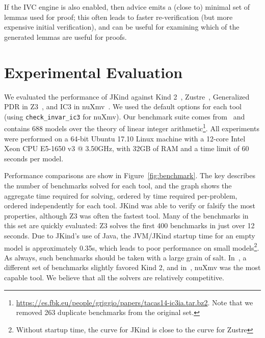 \documentclass{llncs}
\newcommand{\jkind}{{\sc JKind}\xspace}
\newcommand{\kind}{{\sc Kind}\xspace}
\newcommand{\nuxmv}{{\sc nuXmv}\xspace}
\newcommand{\zustre}{{\sc Zustre}\xspace}
\newcommand{\zthree}{{\sc Z3}\xspace}
\begin{document}
If the IVC engine is also enabled, then advice emits a (close to) minimal set of lemmas used for proof; this often leads to faster re-verification (but more expensive initial verification), and can be useful for examining which of the generated lemmas are useful for proofs.

\section{Experimental Evaluation}
\label{sec:experiment}
We evaluated the performance of \jkind against \kind
2~\cite{champion2016cav}, \zustre~\cite{Zustre}, Generalized PDR in
\zthree~\cite{GPDR}, and IC3 in \nuxmv~\cite{cimatti2014tacas}. We
used the default options for each tool (using {\tt check\_invar\_ic3}
for \nuxmv).  Our benchmark suite comes from~\cite{cimatti2014tacas}
and contains 688 models over the theory of linear integer
arithmetic\footnote{\url{https://es.fbk.eu/people/griggio/papers/tacas14-ic3ia.tar.bz2}.
  Note that we removed 263 duplicate benchmarks from the original
  set.}.  All experiments were performed on a 64-bit Ubuntu
17.10 Linux machine with a 12-core Intel Xeon CPU E5-1650 v3 @
3.50GHz, with 32GB of RAM and a time limit of 60 seconds per model.

Performance comparisons are show in
Figure~\ref{fig:benchmark}. The key describes the number of benchmarks
solved for each tool, and the graph shows the aggregate time required
for solving, ordered by time required per-problem, ordered
independently for each tool. \jkind was able to verify or falsify the
most properties, although \zthree was often the fastest tool. Many of
the benchmarks in this set are quickly evaluated: \zthree solves the
first 400 benchmarks in just over 12 seconds.  Due to \jkind's use of
Java, the JVM/\jkind startup time for an empty
model is approximately 0.35s, which leads to poor performance on small
models\footnote{Without startup time, the curve for \jkind is close to
  the curve for \zustre}.  As always, such benchmarks should be taken
with a large grain of salt.  In~\cite{champion2016cav}, a different
set of benchmarks slightly favored \kind2, and
in~\cite{cimatti2014tacas}, \nuxmv was the most capable tool.  We
believe that all the solvers are relatively competitive.
\end{document}
